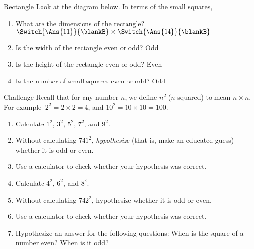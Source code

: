 \documentclass[12pt,letterpaper]{article}
\begin{document}
\begin{problem}{Rectangle}
 Look at the diagram below. In terms of the small squares,

 \begin{center}
 \end{center}

 \begin{enumerate}
  \item What are the dimensions of the rectangle? \hfill
  \(\Switch{\Ans{11}}{\blankB}\times\Switch{\Ans{14}}{\blankB}\)
  \item Is the width of the rectangle even or odd?
  \hfill Odd \hspace{1em} 
  \item Is the height of the rectangle even or odd?
  \hfill {} \hspace{1em} Even
  \item Is the number of small squares even or odd?
  \hfill Odd \hspace{1em} 
 \end{enumerate}
\end{problem}

\begin{problem}{Challenge}
 Recall that for any number $n$, we define $n^2$ ($n$ squared) to mean
 $n\times n$. For example, $2^2=2\times2=4$, and $10^2=10\times10=100$.

 \begin{enumerate}
  \item Calculate $1^2$, $3^2$, $5^2$, $7^2$, and $9^2$.
  \item Without calculating $741^2$, \emph{hypothesize} (that is, make an
  educated guess) whether it is odd or even.
  \item Use a calculator to check whether your hypothesis was correct.
  \item Calculate $4^2$, $6^2$, and $8^2$.
  \item Without calculating $742^2$, hypothesize whether it is odd or even.
  \item Use a calculator to check whether your hypothesis was correct.
  \item Hypothesize an answer for the following questions:
  When is the square of a number even? When is it odd?
 \end{enumerate}
\end{problem}
\end{document}

